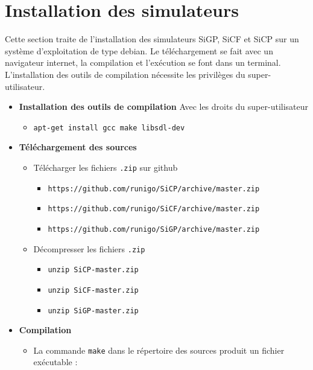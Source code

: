 \section{Installation des simulateurs}
Cette section traite de l'installation des simulateurs SiGP, SiCF et SiCP sur un système d'exploitation de type debian. Le téléchargement se fait avec un navigateur internet, la compilation et l'exécution se font dans un terminal. L'installation des outils de compilation nécessite les privilèges du super-utilisateur.
\begin{itemize}[leftmargin=1cm, label=, itemsep=0pt]
\item {\bf Installation des outils de compilation}
Avec les droits du super-utilisateur
	\begin{itemize}[leftmargin=1cm, label=, itemsep=0pt]
	\item \texttt{apt-get install gcc make libsdl-dev}
	\end{itemize}
\item {\bf Téléchargement des sources}
	\begin{itemize}[leftmargin=1cm, label=, itemsep=0pt]
	\item Télécharger les fichiers \texttt{.zip} sur github
		\begin{itemize}[leftmargin=1cm, label=, itemsep=0pt]
		\item \texttt{https://github.com/runigo/SiCP/archive/master.zip}
		\item \texttt{https://github.com/runigo/SiCF/archive/master.zip}
		\item \texttt{https://github.com/runigo/SiGP/archive/master.zip}
		\end{itemize}
	\item Décompresser les fichiers \texttt{.zip}
		\begin{itemize}[leftmargin=1cm, label=, itemsep=0pt]
		\item \texttt{unzip SiCP-master.zip}
		\item \texttt{unzip SiCF-master.zip}
		\item \texttt{unzip SiGP-master.zip}
		\end{itemize}
	\end{itemize}
\item {\bf Compilation}
	\begin{itemize}[leftmargin=1cm, label=, itemsep=0pt]
	\item La commande \texttt{make} dans le répertoire des sources produit un fichier exécutable :

\end{itemize}
\end{itemize}
